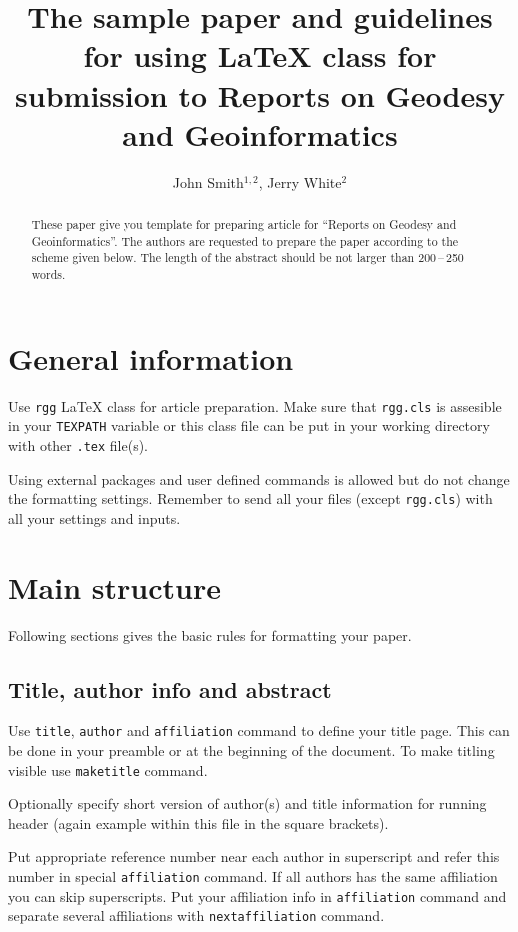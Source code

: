 \documentclass{rgg}
\title[The sample paper\ldots]{%
  The sample paper and guidelines for using \LaTeX{} class for submission to 
  Reports on Geodesy and Geoinformatics}
\author[Smith, J., White, J.]{John Smith$^{1,2}$, Jerry White$^2$}
\affiliation{%
  $^1$Department of Very Important Issues,\\
  Faculty of Even More Important Issues,\\
  Awesome University
  \nextaffiliation
  $^2$Department of Geodesy Affairs,\\
  Institute of Geodesy and Geoinformatcis
}
\begin{document}
\maketitle

    \begin{abstract}
      These paper give you template for preparing article for ``Reports on 
      Geodesy and Geoinformatics''. The authors are requested to prepare the 
      paper according to the scheme given below. The length of the abstract 
      should be not larger than 200\,–\,250 words.
    \end{abstract}

  \section{General information}
    Use \texttt{rgg} \LaTeX{} class for article preparation.
    Make sure that \texttt{rgg.cls} is assesible in your
    \texttt{TEXPATH} variable or this class file can be put
    in your working directory with other \texttt{.tex} file(s).

    Using external packages and user defined commands is allowed
    but do not change the formatting settings.
    Remember to send all your files (except \texttt{rgg.cls}) 
    with all your settings and inputs.

  \section{Main structure}
    \label{labelforsection}

    Following sections gives the basic rules for formatting your
    paper.

  \subsection{Title, author info and abstract}
    Use \texttt{title}, \texttt{author} 
    and \texttt{affiliation} command
    to define your title page. This can be done
    in your preamble or at the beginning of the document.
    To make titling visible use \texttt{maketitle} command.

    Optionally specify short version of author(s) and title information
    for running header (again example within this file in the square brackets).

    Put appropriate reference number near each author in superscript
    and refer this number in special \texttt{affiliation} command.
    If all authors has the same affiliation you can skip superscripts.
    Put your affiliation info in \texttt{affiliation} command
    and separate several affiliations with \texttt{nextaffiliation} command.
\end{document}
